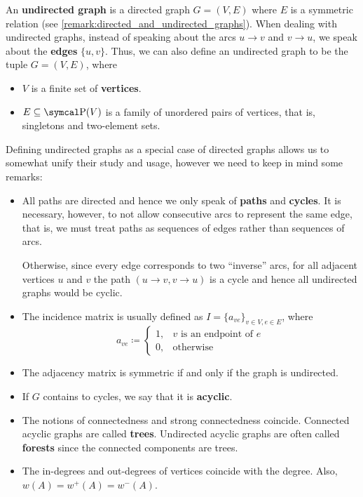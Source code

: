 \begin{definition}\label{def:undirected_graph}
  An \textbf{undirected graph} is a directed graph \( G = (V, E) \) where \( E \) is a symmetric relation (see \cref{remark:directed_and_undirected_graphs}). When dealing with undirected graphs, instead of speaking about the arcs \( u \to v \) and \( v \to u \), we speak about the \textbf{edges} \( \{ u, v \} \). Thus, we can also define an undirected graph to be the tuple \( G = (V, E) \), where
  \begin{itemize}
    \item \( V \) is a finite set of \textbf{vertices}.
    \item \( E \subseteq \Power(V) \) is a family of unordered pairs of vertices, that is, singletons and two-element sets.
  \end{itemize}

  Defining undirected graphs as a special case of directed graphs allows us to somewhat unify their study and usage, however we need to keep in mind some remarks:
  \begin{itemize}
    \item All paths are directed and hence we only speak of \textbf{paths} and \textbf{cycles}. It is necessary, however, to not allow consecutive arcs to represent the same edge, that is, we must treat paths as sequences of edges rather than sequences of arcs.

    Otherwise, since every edge corresponds to two \enquote{inverse} arcs, for all adjacent vertices \( u \) and \( v \) the path \( (u \to v, v \to u) \) is a cycle and hence all undirected graphs would be cyclic.

    \item The incidence matrix is usually defined as \( I = \{ a_{ve} \}_{v \in V, e \in E} \), where
    \begin{equation*}
      a_{ve} \coloneqq \begin{cases}
        1, &v \text{ is an endpoint of } e \\
        0, &\text{otherwise}
      \end{cases}
    \end{equation*}

    \item The adjacency matrix is symmetric if and only if the graph is undirected.

    \item If \( G \) contains to cycles, we say that it is \textbf{acyclic}.

    \item The notions of connectedness and strong connectedness coincide. Connected acyclic graphs are called \textbf{trees}. Undirected acyclic graphs are often called \textbf{forests} since the connected components are trees.

    \item The in-degrees and out-degrees of vertices coincide with the degree. Also, \( w(A) = w^+(A) = w^-(A) \).
  \end{itemize}
\end{definition}

